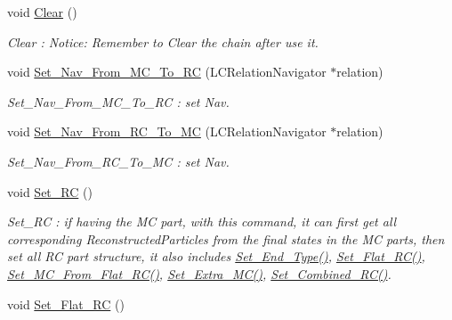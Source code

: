 \begin{DoxyCompactItemize}
\item 
void \hyperlink{classToolSet_1_1CChain__Single_ae991aff7b553d31f4073eb5aaf0e0440}{Clear} ()
\begin{DoxyCompactList}\small\item\em Clear : Notice: Remember to Clear the chain after use it. \item\end{DoxyCompactList}\item 
void \hyperlink{classToolSet_1_1CChain__Single_ad0af64f3a95dea5a7205a03a0b5c6b2d}{Set\_\-Nav\_\-From\_\-MC\_\-To\_\-RC} (LCRelationNavigator $\ast$relation)
\begin{DoxyCompactList}\small\item\em Set\_\-Nav\_\-From\_\-MC\_\-To\_\-RC : set Nav. \item\end{DoxyCompactList}\item 
void \hyperlink{classToolSet_1_1CChain__Single_ad2311e70909778460c342a2b93387db6}{Set\_\-Nav\_\-From\_\-RC\_\-To\_\-MC} (LCRelationNavigator $\ast$relation)
\begin{DoxyCompactList}\small\item\em Set\_\-Nav\_\-From\_\-RC\_\-To\_\-MC : set Nav. \item\end{DoxyCompactList}\item 
\hypertarget{classToolSet_1_1CChain__Single_aa19e64ca690f5c83ad53e2b55497bbe9}{
void \hyperlink{classToolSet_1_1CChain__Single_aa19e64ca690f5c83ad53e2b55497bbe9}{Set\_\-RC} ()}
\label{classToolSet_1_1CChain__Single_aa19e64ca690f5c83ad53e2b55497bbe9}

\begin{DoxyCompactList}\small\item\em Set\_\-RC : if having the MC part, with this command, it can first get all corresponding ReconstructedParticles from the final states in the MC parts, then set all RC part structure, it also includes \hyperlink{classToolSet_1_1CChain__Single_a2c537f2ce11c54ec4483efc11e3205f8}{Set\_\-End\_\-Type()}, \hyperlink{classToolSet_1_1CChain__Single_af389892522f28cc771383e264463eb93}{Set\_\-Flat\_\-RC()}, \hyperlink{classToolSet_1_1CChain__Single_a1773179b963d71ba48df8060b4916a27}{Set\_\-MC\_\-From\_\-Flat\_\-RC()}, \hyperlink{classToolSet_1_1CChain__Single_a020fb2a7b3b6f65890f45b5bde4c7050}{Set\_\-Extra\_\-MC()}, \hyperlink{classToolSet_1_1CChain__Single_a7474584ac9cbcaf32f0b046bd733756d}{Set\_\-Combined\_\-RC()}. \item\end{DoxyCompactList}\item 
\hypertarget{classToolSet_1_1CChain__Single_af389892522f28cc771383e264463eb93}{
void \hyperlink{classToolSet_1_1CChain__Single_af389892522f28cc771383e264463eb93}{Set\_\-Flat\_\-RC} ()}
\label{classToolSet_1_1CChain__Single_af389892522f28cc771383e264463eb93}


\end{DoxyCompactItemize}
